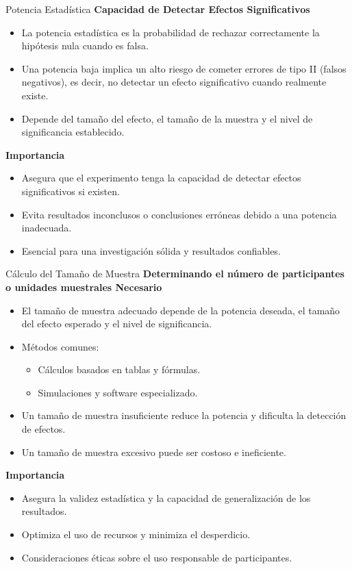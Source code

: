 ﻿\documentclass{beamer}
\begin{document}
\begin{frame}{Potencia Estadística}
\textbf{Capacidad de Detectar Efectos Significativos}
\begin{itemize}
    \item La potencia estadística es la probabilidad de rechazar correctamente la hipótesis nula cuando es falsa.
    \item Una potencia baja implica un alto riesgo de cometer errores de tipo II (falsos negativos), es decir, no detectar un efecto significativo cuando realmente existe.
    \item Depende del tamaño del efecto, el tamaño de la muestra y el nivel de significancia establecido.
\end{itemize}

\textbf{Importancia}
\begin{itemize}
    \item Asegura que el experimento tenga la capacidad de detectar efectos significativos si existen.
    \item Evita resultados inconclusos o conclusiones erróneas debido a una potencia inadecuada.
    \item Esencial para una investigación sólida y resultados confiables.
\end{itemize}
\end{frame}

\begin{frame}{Cálculo del Tamaño de Muestra}
\textbf{Determinando el número de participantes o unidades muestrales Necesario}
\begin{itemize}
    \item El tamaño de muestra adecuado depende de la potencia deseada, el tamaño del efecto esperado y el nivel de significancia.
    \item Métodos comunes:
    \begin{itemize}
        \item Cálculos basados en tablas y fórmulas.
        \item Simulaciones y software especializado.
    \end{itemize}
    \item Un tamaño de muestra insuficiente reduce la potencia y dificulta la detección de efectos.
    \item Un tamaño de muestra excesivo puede ser costoso e ineficiente.
\end{itemize}

\textbf{Importancia}
\begin{itemize}
    \item Asegura la validez estadística y la capacidad de generalización de los resultados.
    \item Optimiza el uso de recursos y minimiza el desperdicio.
    \item Consideraciones éticas sobre el uso responsable de participantes.
\end{itemize}
\end{frame}
\end{document}

